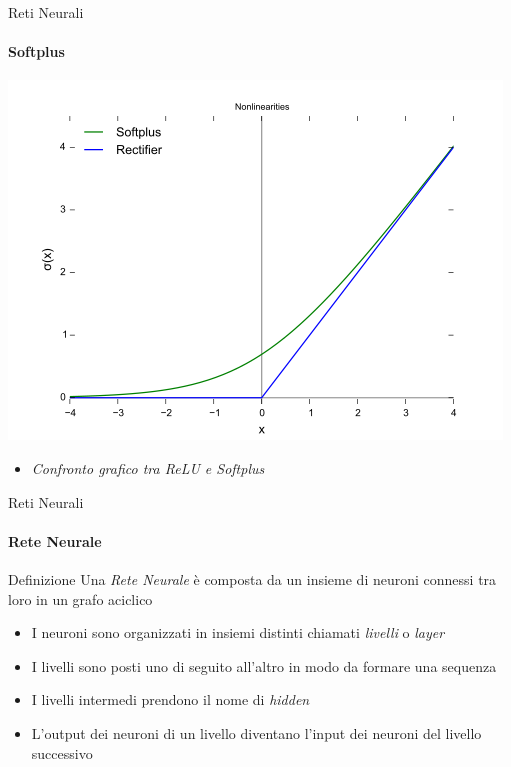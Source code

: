 \documentclass[
 ]{beamer}
\begin{document}
\begin{frame}{Reti Neurali}
    \framesubtitle{Softplus}
    
    \begin{center}
      \includegraphics[scale = 0.45]{softplus_vs_rectifier.png}
    \end{center}
  
    \smallskip
  
  \begin{itemize}
    \setlength\itemsep{1em}
    \item[] \large \emph{Confronto grafico tra ReLU e Softplus}
  \end{itemize}       
\end{frame} 

\begin{frame}{Reti Neurali}
    \framesubtitle{Rete Neurale}
    
    \begin{block}{Definizione} 
        \large Una \emph{Rete Neurale} è composta da un insieme di neuroni connessi tra loro in un grafo aciclico
    \end{block}\pause
    
    \begin{itemize} [<+->]
        \setlength\itemsep{2em}
        \item \large  I neuroni sono organizzati in insiemi distinti chiamati \emph{livelli} o \emph{layer}
        \item \large I livelli sono posti uno di seguito all'altro in modo da formare una sequenza
        \item \large I livelli intermedi prendono il nome di \emph{hidden}
        \item \large L'output dei neuroni di un livello diventano l'input dei neuroni del livello successivo        
    \end{itemize}
\end{frame}
\end{document}
